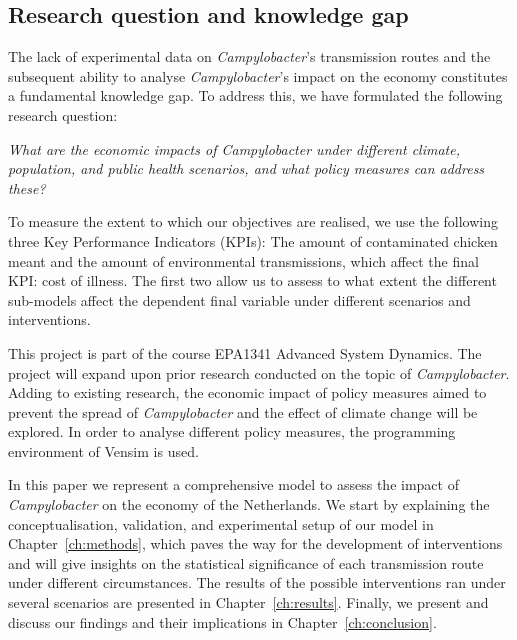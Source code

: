 \subsection*{Research question and knowledge gap}

The lack of experimental data on \textit{Campylobacter}’s transmission routes and the subsequent ability to analyse \textit{Campylobacter}’s impact on the economy constitutes a fundamental knowledge gap. To address this, we have formulated the following research question:
\begin{center}\textit{\textcolor{NiceBlue}{
What are the economic impacts of Campylobacter under different climate, population, and public health scenarios, and what policy measures can address these? 
}}
\end{center}
To measure the extent to which our objectives are realised, we use the following three Key Performance Indicators (KPIs): The amount of contaminated chicken meant and the amount of environmental transmissions, which affect the final KPI: cost of illness. The first two allow us to assess to what extent the different sub-models affect the dependent final variable under different scenarios and interventions.

This project is part of the course EPA1341 Advanced System Dynamics. The project will expand upon prior research conducted on the topic of \textit{Campylobacter}. Adding to existing research, the economic impact of policy measures aimed to prevent the spread of  \textit{Campylobacter} and the effect of climate change will be explored. In order to analyse different policy measures, the programming environment of Vensim is used. 

In this paper we represent a comprehensive model to assess the impact of \textit{Campylobacter} on the economy of the Netherlands. We start by explaining the conceptualisation, validation, and experimental setup of our model in Chapter~\ref{ch:methods}, which paves the way for the development of interventions and will give insights on the statistical significance of each transmission route under different circumstances. The results of the possible interventions ran under several scenarios are presented in Chapter~\ref{ch:results}. Finally, we present and discuss our findings and their implications in Chapter~\ref{ch:conclusion}.

